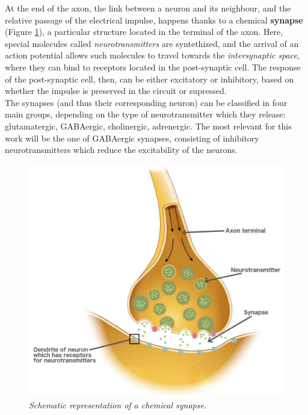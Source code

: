\documentclass[12pt, a4paper]{article}
\begin{document}
At the end of the axon, the link between a neuron and its neighbour, and the relative passage of the electrical impulse, happens thanks to a chemical \textbf{synapse} (Figure \ref{synapse}), a particular structure located in the terminal of the axon. Here, special molecules called \textit{neurotransmitters} are syntethized, and the arrival of an action potential allows such molecules to travel towards the \textit{intersynaptic space}, where they can bind to receptors located in the post-synaptic cell. The response of the post-synaptic cell, then, can be either excitatory or inhibitory, based on whether the impulse is preserved in the circuit or supressed.\\
The synapses (and thus their corresponding neuron) can be classified in four main groups, depending on the type of neurotransmitter which they release:  glutamatergic, GABAergic, cholinergic,  adrenergic. The most relevant for this work will be the one of GABAergic synapses, consisting of inhibitory neurotransmitters which reduce the excitability of the neurons.
\begin{figure}[H]
	\begin{center}
		\includegraphics[scale=0.2]{synapse.jpg} 
	\end{center} 
	\caption{\textit{Schematic representation of a chemical synapse.}}\label{synapse}
	
\end{figure}
\end{document}
